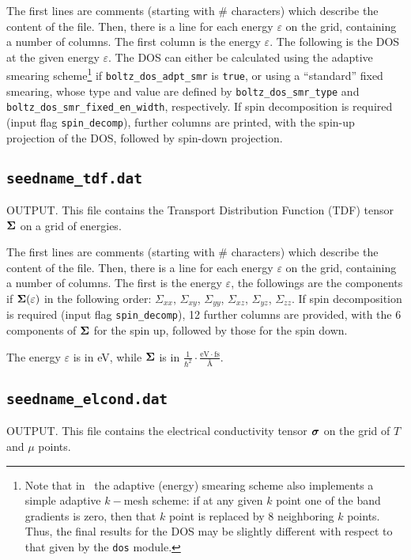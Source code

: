 The first lines are comments (starting with \# characters) which describe the content of the file.
Then, there is a line for each energy $\varepsilon$ on the grid, containing a number of columns. The first column is the energy $\varepsilon$. The following is the DOS at the given energy $\varepsilon$.
The DOS can either be calculated using the adaptive smearing scheme\footnote{%
Note that in \bw\ the adaptive (energy) smearing scheme also implements a simple adaptive $k-$mesh scheme:
if at any given $k$ point one of the band gradients is zero, then that $k$ point is replaced by 8 neighboring $k$ points. Thus, the final results for the DOS may be slightly different with respect to that given by the {\tt dos} module.} if {\tt boltz\_dos\_adpt\_smr} is \verb#true#, or using a ``standard'' fixed smearing, whose type and value are defined by {\tt boltz\_dos\_smr\_type} and {\tt boltz\_dos\_smr\_fixed\_en\_width}, respectively.
If spin decomposition is required (input flag {\tt spin\_decomp}), further columns are printed, with the spin-up projection of the DOS, followed by spin-down projection.

\subsection{{\tt seedname\_tdf.dat}}
OUTPUT. This file contains the Transport Distribution Function (TDF) tensor $\bm{\mathrm{\Sigma}}$ on a grid of energies. 

The first lines are comments (starting with \# characters) which describe the content of the file.
Then, there is a line for each energy $\varepsilon$ on the grid, containing a number of columns. The first is the energy $\varepsilon$, the followings are the components if $\bm{\mathrm{\Sigma}}(\varepsilon)$ in the following order: $\Sigma_{xx}$, $\Sigma_{xy}$, $\Sigma_{yy}$, $\Sigma_{xz}$, $\Sigma_{yz}$, $\Sigma_{zz}$. If spin decomposition is required (input flag {\tt spin\_decomp}), 12 further columns are provided, with the 6 components of $\bm{\mathrm{\Sigma}}$ for the spin up, followed by those for the spin down.

The energy $\varepsilon$ is in eV, while $\bm{\mathrm{\Sigma}}$ is in 
 $\displaystyle\frac{1}{\hbar^2}\cdot\frac{\mathrm{eV}\cdot\mathrm{fs}}{\text{\AA}}$.

\subsection{{\tt seedname\_elcond.dat}}
OUTPUT. This file contains the electrical conductivity tensor $\bm{\mathrm{\sigma}}$ on the grid of $T$ and $\mu$ points. 

